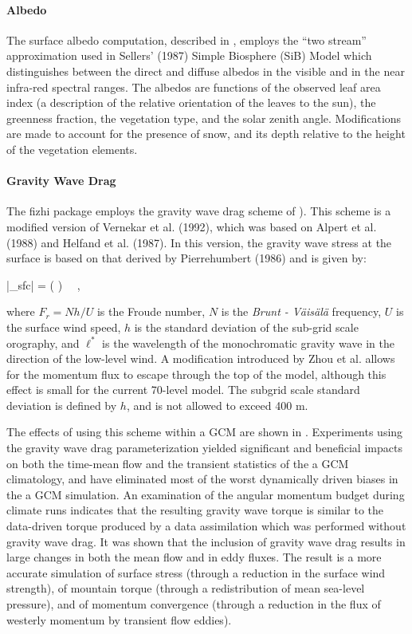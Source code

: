 \paragraph{Albedo}
The surface albedo computation, described in \cite{ks:91},
employs the ``two stream'' approximation used in Sellers' (1987) Simple Biosphere (SiB)
Model which distinguishes between the direct and diffuse albedos in the visible
and in the near infra-red spectral ranges. The albedos are functions of the observed
leaf area index (a description of the relative orientation of the leaves to the
sun), the greenness fraction, the vegetation type, and the solar zenith angle.
Modifications are made to account for the presence of snow, and its depth relative
to the height of the vegetation elements.

\paragraph{Gravity Wave Drag}

The fizhi package employs the gravity wave drag scheme of \cite{zhouetal:95}).
This scheme is a modified version of Vernekar et al. (1992),
which was based on Alpert et al. (1988) and Helfand et al. (1987).  
In this version, the gravity wave stress at the surface is
based on that derived by Pierrehumbert (1986) and is given by:

\bq
|\vec{\tau}_{sfc}| =  \left( \right) \, \, ,
\eq

where $F_r = N h /U$ is the Froude number, $N$ is the {\em Brunt - V\"{a}is\"{a}l\"{a}} frequency, $U$ is the 
surface wind speed, $h$ is the standard deviation of the sub-grid scale orography,
and $\ell^*$ is the wavelength of the monochromatic gravity wave in the direction of the low-level wind.
A modification introduced by Zhou et al. allows for the momentum flux to
escape through the top of the model, although this effect is small for the current 70-level model.  
The subgrid scale standard deviation is defined by $h$, and is not allowed to exceed 400 m. 

The effects of using this scheme within a GCM are shown in \cite{taksz:96}.
Experiments using the gravity wave drag parameterization yielded significant and
beneficial impacts on both the time-mean flow and the transient statistics of the
a GCM climatology, and have eliminated most of the worst dynamically driven biases 
in the a GCM simulation. 
An examination of the angular momentum budget during climate runs indicates that the 
resulting gravity wave torque is similar to the data-driven torque produced by a data 
assimilation which was performed without gravity
wave drag.  It was shown that the inclusion of gravity wave drag results in 
large changes in both the mean flow and in eddy fluxes.
The result is a more
accurate simulation of surface stress (through a reduction in the surface wind strength), 
of mountain torque (through a redistribution of mean sea-level pressure), and of momentum
convergence (through a reduction in the flux of westerly momentum by transient flow eddies).  


